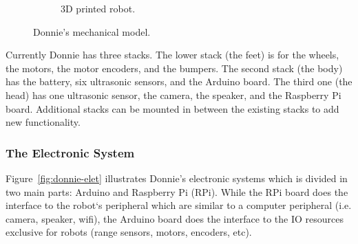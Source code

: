 \begin{figure}[h!]
\begin{subfigure}[b]{0.8\linewidth}
        \caption{3D printed robot.}
    \end{subfigure}
    \caption{Donnie's mechanical model.}
    \label{fig:donnie-mech}
\end{figure}



Currently Donnie has three stacks. The lower stack (the feet) is for the wheels, the motors, the motor encoders, and the bumpers. The second stack (the body) has the battery, six ultrasonic sensors, and the Arduino board. The third one (the head) has one ultrasonic sensor, the camera, the speaker, and the Raspberry Pi board. Additional stacks can be mounted in between the existing stacks to add new functionality.


\subsubsection{The Electronic System}
\label{sec:elet}

Figure~\ref{fig:donnie-elet} illustrates Donnie's electronic systems which is divided in two main parts: Arduino and Raspberry Pi (RPi). While the RPi board does the interface to the robot`s peripheral which are similar to a computer peripheral (i.e. camera, speaker, wifi), the Arduino board does the interface to the IO resources exclusive for robots (range sensors, motors, encoders, etc). 

